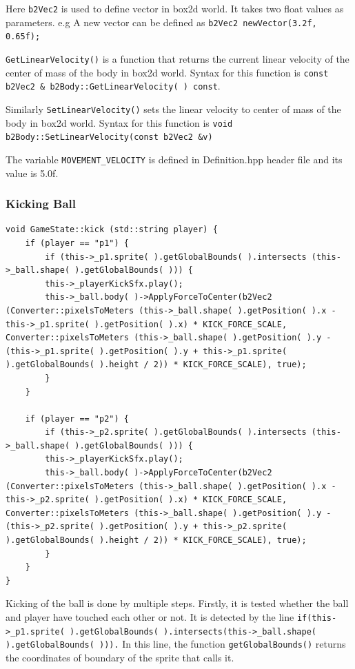\documentclass[main]{subfiles}
\begin{document}
Here \texttt{b2Vec2} is used to define vector in box2d world. It takes two float values as parameters. e.g A new vector can be defined as \texttt{b2Vec2 newVector(3.2f, 0.65f);} 

\texttt{GetLinearVelocity()} is a function that returns the current linear velocity of the center of mass of the body in box2d world. Syntax for this function is \texttt{const b2Vec2 \& b2Body::GetLinearVelocity( ) const}. 

Similarly \texttt{SetLinearVelocity()} sets the linear velocity to center of mass of the body in box2d world. Syntax for this function is \texttt{void b2Body::SetLinearVelocity(const b2Vec2 \&v)}

The variable \texttt{MOVEMENT\_VELOCITY} is defined in Definition.hpp header file and its value is 5.0f.

\subsubsection{Kicking Ball}
\begin{verbatim}
void GameState::kick (std::string player) {
    if (player == "p1") {
        if (this->_p1.sprite( ).getGlobalBounds( ).intersects (this->_ball.shape( ).getGlobalBounds( ))) {
        this->_playerKickSfx.play();
        this->_ball.body( )->ApplyForceToCenter(b2Vec2 (Converter::pixelsToMeters (this->_ball.shape( ).getPosition( ).x - this->_p1.sprite( ).getPosition( ).x) * KICK_FORCE_SCALE, Converter::pixelsToMeters (this->_ball.shape( ).getPosition( ).y - (this->_p1.sprite( ).getPosition( ).y + this->_p1.sprite( ).getGlobalBounds( ).height / 2)) * KICK_FORCE_SCALE), true);
        }
    }

    if (player == "p2") {
        if (this->_p2.sprite( ).getGlobalBounds( ).intersects (this->_ball.shape( ).getGlobalBounds( ))) {
        this->_playerKickSfx.play();
        this->_ball.body( )->ApplyForceToCenter(b2Vec2 (Converter::pixelsToMeters (this->_ball.shape( ).getPosition( ).x - this->_p2.sprite( ).getPosition( ).x) * KICK_FORCE_SCALE, Converter::pixelsToMeters (this->_ball.shape( ).getPosition( ).y - (this->_p2.sprite( ).getPosition( ).y + this->_p2.sprite( ).getGlobalBounds( ).height / 2)) * KICK_FORCE_SCALE), true);               
        }
    }
}
\end{verbatim}
Kicking of the ball is done by multiple steps. Firstly, it is tested whether the ball and player have touched each other or not. It is detected by the line \texttt{if(this->\_p1.sprite( ).getGlobalBounds( ).intersects(this->\_ball.shape( ).getGlobalBounds( ))).} In this line, the function  \texttt{getGlobalBounds()} returns the coordinates of boundary of the sprite that calls it. 
\end{document}
